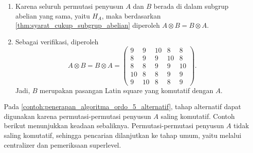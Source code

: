 \begin{contoh}
\begin{enumerate}
    \item Karena seluruh permutasi penyusun $A$ dan $B$ berada di dalam
          subgrup abelian yang sama, yaitu $H_A$, maka berdasarkan
          \autoref{thm:syarat_cukup_subgrup_abelian} diperoleh
          $A\otimes B=B\otimes A$.

    \item Sebagai verifikasi, diperoleh
          \[
            A\otimes B
            =
            B\otimes A
            =
            \begin{pmatrix}
              9  & 9  & 10 & 8  & 8  \\
              8  & 9  & 9  & 10 & 8  \\
              8  & 8  & 9  & 9  & 10 \\
              10 & 8  & 8  & 9  & 9  \\
              9  & 10 & 8  & 8  & 9
            \end{pmatrix}.
          \]
          Jadi, $B$ merupakan pasangan Latin square yang komutatif dengan $A$.
  \end{enumerate}
\end{contoh}

Pada \autoref{contoh:penerapan_algoritma_ordo_5_alternatif}, tahap alternatif
dapat digunakan karena permutasi-permutasi penyusun $A$ saling komutatif.
Contoh berikut menunjukkan keadaan sebaliknya. Permutasi-permutasi penyusun
$A$ tidak saling komutatif, sehingga pencarian dilanjutkan ke tahap umum,
yaitu melalui centralizer dan pemeriksaan superlevel.

